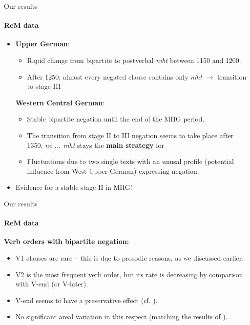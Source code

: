 \documentclass[xcolor=table, compress, %
handout
]{beamer}
\begin{document}
\begin{frame}{Our results}
\framesubtitle{ReM data}

\begin{itemize}
\item \textbf{Upper German}: 
\begin{itemize} 
\item Rapid change from bipartite to postverbal \textit{niht} between 1150 and 1200. 
\item After 1250, almost every negated clause contains \alert{only \textit{niht}} $\rightarrow$ transition to stage III
\end{itemize}
\textbf{Western Central German}: 
\begin{itemize}
\item \alert{Stable bipartite negation} until the end of the MHG period.
\item The transition from stage II to III negation seems to take place after 1350. \textit{ne ... niht} stays the \textbf{main strategy} for 
\item Fluctuations due to two single texts with an unusal profile (potential influence from West Upper German)
expressing negation.
\end{itemize}
\end{itemize}

{\small
\begin{itemize}
\item[\Pointinghand] Evidence for a stable stage II in MHG!
\end{itemize}
}    

\end{frame}

\begin{frame}{Our results}
\framesubtitle{ReM data}

\textbf{Verb orders with bipartite negation:}
    
\begin{itemize}
\item \alert{V1 clauses are rare} – this is due to prosodic reasons, as we discussed earlier.
\item \alert{V2} is the \alert{most frequent} verb order, but its rate is \alert{decreasing} by comparison with V-end (or V-later).
\item \alert{V-end} seems to have a \alert{preservative effect} (cf. \citealt[245]{behaghel18}).
\end{itemize}

{\small
\begin{itemize}
\item[\Pointinghand] No significant areal variation in this respect (matching the results of \citealt{HertelimErscheinen}).
\end{itemize}
}
    
\end{frame}
\end{document}
